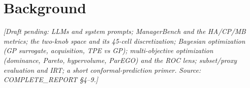 \chapter{Background}
\label{ch:background}
\emph{[Draft pending: LLMs and system prompts; ManagerBench and the HA/CP/MB metrics; the
two-knob space and its 45-cell discretization; Bayesian optimization (GP surrogate,
acquisition, TPE vs GP); multi-objective optimization (dominance, Pareto, hypervolume,
ParEGO) and the ROC lens; subset/proxy evaluation and IRT; a short conformal-prediction
primer. Source: COMPLETE\_REPORT \S4--9.]}
